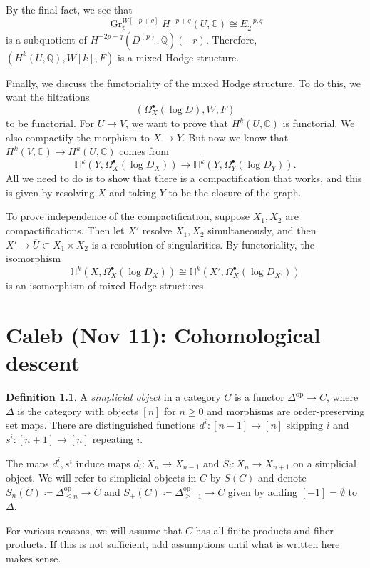 \documentclass[leqno, openany]{memoir}
\theoremstyle{definition}
\newtheorem{defn}[thm]{Definition}
\theoremstyle{remark}
\theoremstyle{plain}
\theoremstyle{definition}
\theoremstyle{remark}
\newcommand{\C}{\mathbb{C}}
\newcommand{\Q}{\mathbb{Q}}
\newcommand{\mr}[1]{\mathrm{#1}}
\newcommand{\on}[1]{\operatorname{#1}}
\newcommand{\ol}[1]{\overline{#1}}
\begin{document}
By the final fact, we see that 
\[ \on{Gr}_p^{W[-p+q]} H^{-p+q}(U, \C) \cong E_2^{-p,q} \] is a subquotient of $H^{-2p+q}(D^{(p)}, \Q)(-r)$. Therefore, $(H^k(U, \Q), W[k], F)$ is a mixed Hodge structure.

Finally, we discuss the functoriality of the mixed Hodge structure. To do this, we want the filtrations
\[ (\Omega_X^{\bullet}(\log D), W, F) \]
to be functorial. For $U \to V$, we want to prove that $H^k(U, \C)$ is functorial. We also compactify the morphism to $X \to Y$. But now we know that $H^k(V, \C) \to H^k(U, \C)$ comes from
\[ \mathbb{H}^k(Y, \Omega_X^{\bullet}(\log D_X)) \to \mathbb{H}^k(Y, \Omega_Y^{\bullet}(\log D_Y)). \]
All we need to do is to show that there is a compactification that works, and this is given by resolving $X$ and taking $Y$ to be the closure of the graph.

To prove independence of the compactification, suppose $X_1, X_2$ are compactifications. Then let $X'$ resolve $X_1, X_2$ simultaneously, and then $X' \to \ol{U} \subset X_1 \times X_2$ is a resolution of singularities. By functoriality, the isomorphism
\[ \mathbb{H}^k(X, \Omega^{\bullet}_X(\log D_X)) \cong \mathbb{H}^k(X', \Omega^{\bullet}_X(\log D_{X'})) \]
is an isomorphism of mixed Hodge structures.

\chapter{Caleb (Nov 11): Cohomological descent}%
\label{cha:caleb_nov_11_cohomological_descent}

\begin{defn}
    A \textit{simplicial object} in a category $C$ is a functor $\Delta^{\mr{op}} \to C$, where $\Delta$ is the category with objects $[n]$ for $n \geq 0$ and morphisms are order-preserving set maps. There are distinguished functions $d^i \colon [n-1] \to [n]$ skipping $i$ and $s^i \colon [n+1] \to [n]$ repeating $i$.
\end{defn}

The maps $d^i, s^i$ induce maps $d_i \colon X_n \to X_{n-1}$ and $S_i \colon X_n \to X_{n+1}$ on a simplicial object. We will refer to simplicial objects in $C$ by $S(C)$ and denote $S_n(C) \coloneqq \Delta^{\mr{op}}_{\leq n} \to C$ and $S_+(C) \coloneqq \Delta_{\geq -1}^{\mr{op}} \to C$ given by adding $[-1] = \emptyset$ to $\Delta$.

For various reasons, we will assume that $C$ has all finite products and fiber products. If this is not sufficient, add assumptions until what is written here makes sense.
\end{document}

